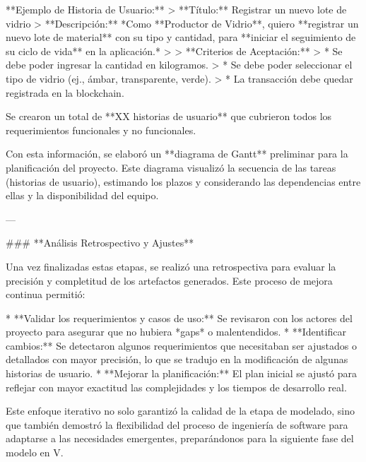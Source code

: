 **Ejemplo de Historia de Usuario:**
> **Título:** Registrar un nuevo lote de vidrio
> **Descripción:** *Como **Productor de Vidrio**, quiero **registrar un nuevo lote de material** con su tipo y cantidad, para **iniciar el seguimiento de su ciclo de vida** en la aplicación.*
>
> **Criterios de Aceptación:**
> * Se debe poder ingresar la cantidad en kilogramos.
> * Se debe poder seleccionar el tipo de vidrio (ej., ámbar, transparente, verde).
> * La transacción debe quedar registrada en la blockchain.

Se crearon un total de **XX historias de usuario** que cubrieron todos los requerimientos funcionales y no funcionales.

Con esta información, se elaboró un **diagrama de Gantt** preliminar para la planificación del proyecto. Este diagrama visualizó la secuencia de las tareas (historias de usuario), estimando los plazos y considerando las dependencias entre ellas y la disponibilidad del equipo.

---

### **Análisis Retrospectivo y Ajustes**

Una vez finalizadas estas etapas, se realizó una retrospectiva para evaluar la precisión y completitud de los artefactos generados. Este proceso de mejora continua permitió:

* **Validar los requerimientos y casos de uso:** Se revisaron con los actores del proyecto para asegurar que no hubiera *gaps* o malentendidos.
* **Identificar cambios:** Se detectaron algunos requerimientos que necesitaban ser ajustados o detallados con mayor precisión, lo que se tradujo en la modificación de algunas historias de usuario.
* **Mejorar la planificación:** El plan inicial se ajustó para reflejar con mayor exactitud las complejidades y los tiempos de desarrollo real.

Este enfoque iterativo no solo garantizó la calidad de la etapa de modelado, sino que también demostró la flexibilidad del proceso de ingeniería de software para adaptarse a las necesidades emergentes, preparándonos para la siguiente fase del modelo en V.
